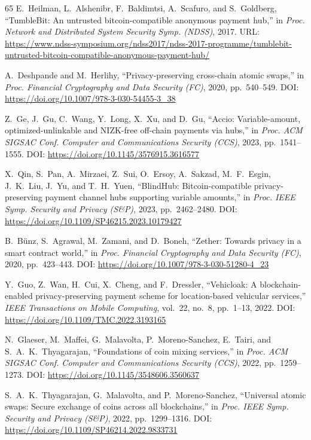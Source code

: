 \documentclass[journal]{IEEEtran}
\begin{document}
\begin{thebibliography}{65}
E.~Heilman, L.~Alshenibr, F.~Baldimtsi, A.~Scafuro, and S.~Goldberg,
``TumbleBit: An untrusted bitcoin-compatible anonymous payment hub,''
in \textit{Proc. Network and Distributed System Security Symp. (NDSS)}, 2017.
\newblock URL: \url{https://www.ndss-symposium.org/ndss2017/ndss-2017-programme/tumblebit-untrusted-bitcoin-compatible-anonymous-payment-hub/}

A.~Deshpande and M.~Herlihy,
``Privacy-preserving cross-chain atomic swaps,''
in \textit{Proc. Financial Cryptography and Data Security (FC)}, 2020,
pp.~540--549.
\newblock DOI: \url{https://doi.org/10.1007/978-3-030-54455-3_38}

Z.~Ge, J.~Gu, C.~Wang, Y.~Long, X.~Xu, and D.~Gu,
``Accio: Variable-amount, optimized-unlinkable and NIZK-free off-chain payments
via hubs,''
in \textit{Proc. ACM SIGSAC Conf. Computer and Communications Security
(CCS)}, 2023, pp.~1541--1555.
\newblock DOI: \url{https://doi.org/10.1145/3576915.3616577}

X.~Qin, S.~Pan, A.~Mirzaei, Z.~Sui, O.~Ersoy, A.~Sakzad, M.~F.~Esgin,
J.~K.~Liu, J.~Yu, and T.~H.~Yuen,
``BlindHub: Bitcoin-compatible privacy-preserving payment channel hubs
supporting variable amounts,''
in \textit{Proc. IEEE Symp. Security and Privacy (S\&P)}, 2023,
pp.~2462--2480.
\newblock DOI: \url{https://doi.org/10.1109/SP46215.2023.10179427}

B.~B{\"u}nz, S.~Agrawal, M.~Zamani, and D.~Boneh,
``Zether: Towards privacy in a smart contract world,''
in \textit{Proc. Financial Cryptography and Data Security (FC)}, 2020,
pp.~423--443.
\newblock DOI: \url{https://doi.org/10.1007/978-3-030-51280-4_23}

Y.~Guo, Z.~Wan, H.~Cui, X.~Cheng, and F.~Dressler,
``Vehicloak: A blockchain-enabled privacy-preserving payment scheme for
location-based vehicular services,''
\textit{IEEE Transactions on Mobile Computing}, vol.~22, no.~8, pp.~1--13,
2022.
\newblock DOI: \url{https://doi.org/10.1109/TMC.2022.3193165}

N.~Glaeser, M.~Maffei, G.~Malavolta, P.~Moreno-Sanchez, E.~Tairi, and
S.~A.~K.~Thyagarajan,
``Foundations of coin mixing services,''
in \textit{Proc. ACM SIGSAC Conf. Computer and Communications Security
(CCS)}, 2022, pp.~1259--1273.
\newblock DOI: \url{https://doi.org/10.1145/3548606.3560637}

S.~A.~K.~Thyagarajan, G.~Malavolta, and P.~Moreno-Sanchez,
``Universal atomic swaps: Secure exchange of coins across all blockchains,''
in \textit{Proc. IEEE Symp. Security and Privacy (S\&P)}, 2022,
pp.~1299--1316.
\newblock DOI: \url{https://doi.org/10.1109/SP46214.2022.9833731}


\end{thebibliography}
\end{document}
